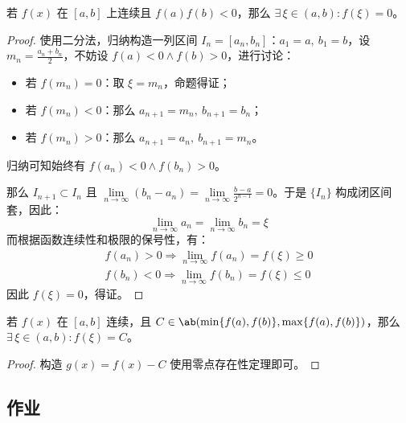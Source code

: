 \begin{theorem}[零点存在性定理]
	若 $f(x)$ 在 $[a, b]$ 上连续且 $f(a) f(b) < 0$，那么 $\exists\,\xi \in (a, b): f(\xi) = 0$。

	\begin{proof}
		使用二分法，归纳构造一列区间 $I_n = [a_n, b_n]$：$a_1 = a,\ b_1 = b$，设 $m_n = \frac{a_n + b_n}{2}$，不妨设 $f(a) < 0 \land f(b) > 0$，进行讨论：

		\begin{itemize}
			\item 若 $f(m_n) = 0$：取 $\xi = m_n$，命题得证；
			\item 若 $f(m_n) < 0$：那么 $a_{n+1} = m_n,\ b_{n+1} = b_n$；
			\item 若 $f(m_n) > 0$：那么 $a_{n+1} = a_n,\ b_{n+1} = m_n$。
		\end{itemize}

		归纳可知始终有 $f(a_n) < 0 \land f(b_n) > 0$。

		那么 $I_{n+1} \subset I_n$ 且 $\lim\limits_{n \to \infty} (b_n - a_n) = \lim\limits_{n \to \infty} \frac{b - a}{2^{n - 1}} = 0$。于是 $\{I_n\}$ 构成闭区间套，因此：
		$$
		\lim_{n \to \infty} a_n = \lim_{n \to \infty} b_n = \xi
		$$
		而根据函数连续性和极限的保号性，有：
		$$
		\begin{gathered}
			f(a_n) > 0 \Rightarrow \lim_{n \to \infty} f(a_n) = f(\xi) \ge 0 \\
			f(b_n) < 0 \Rightarrow \lim_{n \to \infty} f(b_n) = f(\xi) \le 0
		\end{gathered}
		$$
		因此 $f(\xi) = 0$，得证。
	\end{proof}
\end{theorem}

\begin{theorem}[介值定理]
	若 $f(x)$ 在 $[a, b]$ 连续，且 $C \in \ab(\min\{f(a), f(b)\}, \max\{f(a), f(b)\})$，那么 $\exists\,\xi \in (a, b): f(\xi) = C$。

	\begin{proof}
		构造 $g(x) = f(x) - C$ 使用零点存在性定理即可。
	\end{proof}
\end{theorem}

\subsection{作业}


